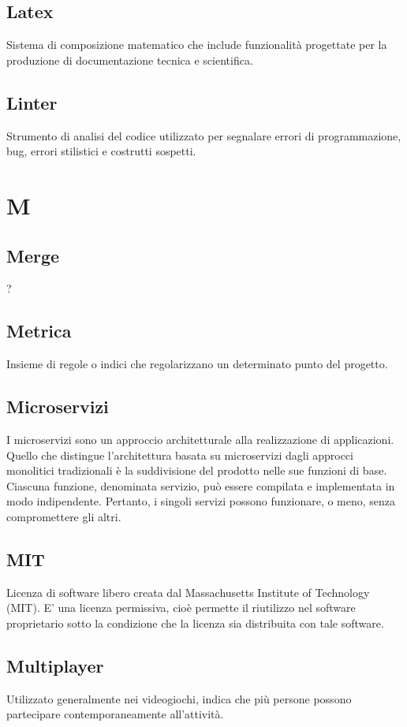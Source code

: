 \subsection*{Latex}
Sistema di composizione matematico che include funzionalità progettate per la produzione di documentazione tecnica e scientifica.

\subsection*{Linter}
Strumento di analisi del codice utilizzato per segnalare errori di programmazione, bug, errori stilistici e costrutti sospetti.

\newpage
\section{M}
\subsection*{Merge}
?

\subsection*{Metrica}
Insieme di regole o indici che regolarizzano un determinato punto del progetto.

\subsection*{Microservizi}
I microservizi sono un approccio architetturale alla realizzazione di applicazioni. 
Quello che distingue l'architettura basata su microservizi dagli approcci monolitici tradizionali è la suddivisione del prodotto nelle sue funzioni di base. Ciascuna funzione, denominata servizio, può essere compilata e implementata in modo indipendente. Pertanto, i singoli servizi possono funzionare, o meno, senza compromettere gli altri.

\subsection*{MIT}
Licenza di software libero creata dal Massachusetts Institute of Technology (MIT). E' una licenza permissiva, cioè permette il riutilizzo nel software proprietario sotto la condizione che la licenza sia distribuita con tale software.

\subsection*{Multiplayer}
Utilizzato generalmente nei videogiochi, indica che più persone possono partecipare contemporaneamente all'attività.


